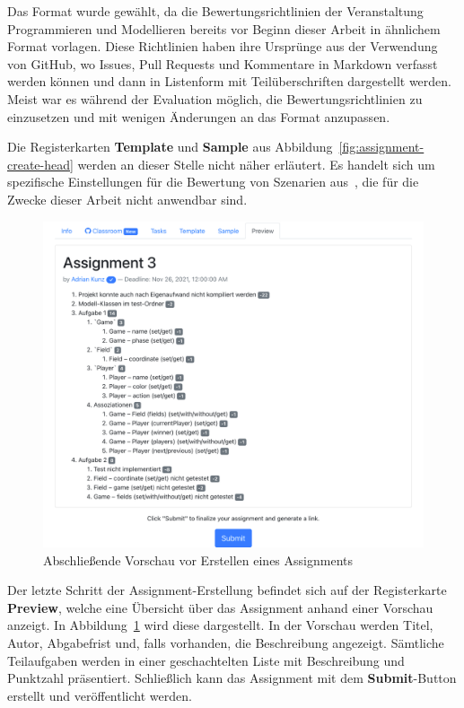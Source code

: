 Das Format wurde gewählt, da die Bewertungsrichtlinien der Veranstaltung Programmieren und Modellieren bereits vor Beginn dieser Arbeit in ähnlichem Format vorlagen.
Diese Richtlinien haben ihre Ursprünge aus der Verwendung von GitHub, wo Issues, Pull Requests und Kommentare in Markdown verfasst werden können und dann in Listenform mit Teilüberschriften dargestellt werden.
Meist war es während der Evaluation möglich, die Bewertungsrichtlinien zu einzusetzen und mit wenigen Änderungen an das Format anzupassen.

Die Registerkarten \textbf{Template} und \textbf{Sample} aus Abbildung~\ref{fig:assignment-create-head} werden an dieser Stelle nicht näher erläutert.
Es handelt sich um spezifische Einstellungen für die Bewertung von Szenarien aus~\cite{bachelor-thesis}, die für die Zwecke dieser Arbeit nicht anwendbar sind.

\begin{figure}
    \centering
    \includegraphics[width=\textwidth]{images/assignment-create-preview}
    \caption{Abschließende Vorschau vor Erstellen eines Assignments}
    \label{fig:assignment-create-preview}
\end{figure}

Der letzte Schritt der Assignment-Erstellung befindet sich auf der Registerkarte \textbf{Preview}, welche eine Übersicht über das Assignment anhand einer Vorschau anzeigt.
In Abbildung~\ref{fig:assignment-create-preview} wird diese dargestellt.
In der Vorschau werden Titel, Autor, Abgabefrist und, falls vorhanden, die Beschreibung angezeigt.
Sämtliche Teilaufgaben werden in einer geschachtelten Liste mit Beschreibung und Punktzahl präsentiert.
Schließlich kann das Assignment mit dem \textbf{Submit}-Button erstellt und veröffentlicht werden.

